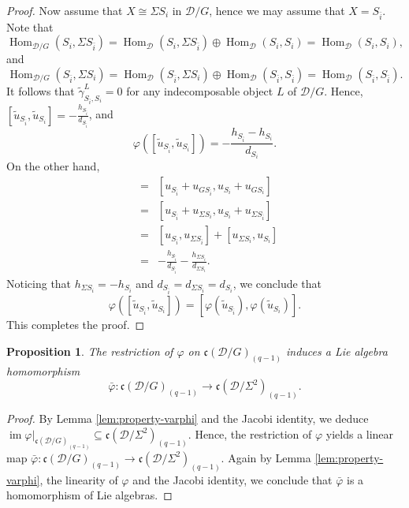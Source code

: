 \documentclass[12pt,reqno]{amsart}
\numberwithin{equation}{section}
\newcommand{\Hom}{\operatorname{Hom}\nolimits}
\newtheorem{proposition}[theorem]{Proposition}
\begin{document}
\begin{proof}
		Now assume that $X\cong \Sigma S_i$ in $\mathcal{D}/G$, hence we may assume that $X= S_{\bar{i}}$.
		Note that 
		\[\Hom_{\mathcal{D}/G}(S_i,\Sigma S_{\bar{i}})=\Hom_{\mathcal{D}}(S_i,\Sigma S_{\bar{i}})\oplus \Hom_{\mathcal{D}}(S_i,S_i)=\Hom_{\mathcal{D}}(S_i,S_i),\]
		and
		\[\Hom_{\mathcal{D}/G}(S_{\bar{i}},\Sigma S_{i})=\Hom_{\mathcal{D}}(S_{\bar{i}},\Sigma S_i)\oplus \Hom_{\mathcal{D}}(S_{\bar{i}},S_{\bar{i}})=\Hom_{\mathcal{D}}(S_{\bar{i}},S_{\bar{i}}).
		\]
		It follows that $\tilde{\gamma}_{S_{\bar{i}},S_i}^L=0$ for any indecomposable object $L$ of $\mathcal{D}/G$. Hence, 
		$[\tilde{u}_{S_{\bar{i}}},\tilde{u}_{S_i}]=-\frac{h_{S_{\bar{i}}}}{d_{S_{\bar{i}}}}$, and 
		\[
		\varphi([\tilde{u}_{S_{\bar{i}}},\tilde{u}_{S_i}])=-\frac{h_{S_{\bar{i}}}-h_{S_i}}{d_{S_i}}.
		\]
		On the other hand,
		\begin{eqnarray*}
			[\varphi( \tilde{u}_{{S_{\bar{i}}}}),\varphi(\tilde{u}_{{S_i}})]&=&[u_{S_{\bar{i}}}+u_{G S_{\bar{i}}},u_{S_i}+u_{G S_i}]\\
			&=&[u_{S_{\bar{i}}}+u_{\Sigma S_i},u_{S_i}+u_{\Sigma S_{\bar{i}}}]\\
			&=&[u_{S_{\bar{i}}},u_{\Sigma S_{\bar{i}}}]+[u_{\Sigma S_i},u_{S_i}]\\
			&=&-\frac{h_{S_{\bar{i}}}}{d_{S_{\bar{i}}}}-\frac{h_{\Sigma S_i}}{d_{\Sigma S_i}}.
		\end{eqnarray*}
		Noticing that $h_{\Sigma S_i}=-h_{S_i}$ and $d_{S_{\bar{i}}}=d_{\Sigma S_i}=d_{S_i}$, we conclude that \[\varphi([\tilde{u}_{S_{\bar{i}}},\tilde{u}_{S_i}])=[\varphi( \tilde{u}_{{S_{\bar{i}}}}),\varphi(\tilde{u}_{{S_i}})].\]
		This completes the proof.
	\end{proof}
	\begin{proposition}\label{pro:homom-Ringel-Hall-algs}
		The restriction of $\varphi$
		on $\mathfrak{c}(\mathcal{D}/G)_{(q-1)} $ induces a Lie algebra homomorphism
		\[
		\bar{\varphi}: \mathfrak{c}(\mathcal{D}/G)_{(q-1)}\longrightarrow \mathfrak{c}(\mathcal{D}/\Sigma^2)_{(q-1)}.
		\]
	\end{proposition}
	\begin{proof}
		By Lemma \ref{lem:property-varphi} and the Jacobi identity, we deduce $\operatorname{im} \varphi|_{\mathfrak{c}(\mathcal{D}/G)_{(q-1)}}\subseteq \mathfrak{c}(\mathcal{D}/\Sigma^2)_{(q-1)}$. Hence, the restriction of $\varphi$ yields a linear map $\bar{\varphi}:\mathfrak{c}(\mathcal{D}/G)_{(q-1)}\rightarrow \mathfrak{c}(\mathcal{D}/\Sigma^2)_{(q-1)}$. Again by Lemma \ref{lem:property-varphi}, the linearity of ${\varphi}$ and the Jacobi identity, we conclude that $\bar{\varphi}$ is a homomorphism of Lie algebras.
	\end{proof}
	
\end{document}
